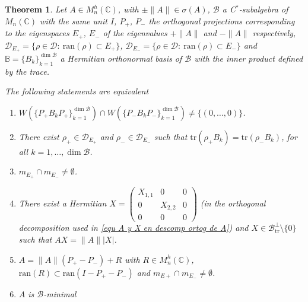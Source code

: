 \documentclass[12pt,a4paper]{article}
\def\calB{\mathcal B}
\def\calD{\mathcal D}
\def\C{\mathbb C}
\def\ran{ \mathop{ran} }
\def\tr{\text{tr}}
\def\ran{\text{ran}}
\newtheorem{theorem}{Theorem}
\numberwithin{equation}{section}
\begin{document}
\begin{theorem} \label{teo equiv JNR y minimal}
Let $A\in M_n^h(\C)$, with $\pm\|A\|\in\sigma(A)$, $\calB$ a C$^*$-subalgebra of $M_n(\C)$ with the same unit $I$, $P_+$, $P_-$ the orthogonal projections corresponding to the eigenspaces $E_+$, $E_-$ of the eigenvalues $+\|A\|$ and $-\|A\|$ respectively, $\calD_{E_+}=\{\rho\in \calD:\  \ran(\rho)\subset E_+\}$, $\calD_{E_-}=\{\rho\in \calD: \ \ran(\rho)\subset E_-\}$ and	$\mathbb{B}=\{B_k\}_{k=1}^{\dim\calB}$ a Hermitian orthonormal basis of $\calB$ with the inner product defined by the trace.

The following statements are equivalent
\begin{enumerate}[label=(\roman*),ref=\textit{(\roman*)}] 
	\item \label{item (1) teo 2} $W\left(\{P_+ B_k P_+\}_{k=1}^{\dim\calB}\right)\cap W\left(\{P_- B_k P_-\}_{k=1}^{\dim\calB}\right)\neq \{(0,\dots,0)\}$.
	\item \label{item (2) teo 2}  There exist $\rho_+\in \calD_{E_+}$ and $\rho_-\in \calD_{E_-}$ such that $\tr(\rho_+B_k )=\tr(\rho_-B_k )$, for all $k=1,\dots,\dim\calB$.
	
	\item \label{item (3) teo 2} $m_{E_+}\cap m_{E_-}\neq \emptyset$.
	\item \label{item (4) teo 2} %
	There exist a Hermitian $X=\left(\begin{smallmatrix}
		X_{1,1}&0&0\\ 0&X_{2,2}&0\\0&0&0
	\end{smallmatrix}\right)$ (in the orthogonal decomposition used in \eqref{equ A y X en descomp ortog de A})  and $X\in\calB_\tr^\perp\setminus\{0\}$ such that $A X =\|A\| \left| X\right|$. 


	\item \label{item (5) teo 2} $A=\|A\|(P_+-P_-)+R$ with $R\in M_n^h(\C)$,   $\ran(R)\subset \ran(I-P_+-P_-)$ and $m_{E+}\cap m_{E_-}\neq \emptyset$.
	\item \label{item (6) teo 2} $A$ is $\calB$-minimal
\end{enumerate}
\end{theorem}
\end{document}
